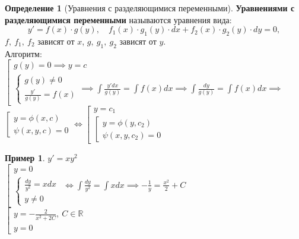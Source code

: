 \documentclass{report}
\theoremstyle{definition}
\newtheorem{definition}{Определение}[section]
\newtheorem{example}{Пример}
\begin{document}
\begin{definition}[Уравнения с разделяющимися переменными]
    \textbf{Уравнениями с разделяющимися переменными} называются уравнения вида:
    \begin{equation*}
        y'=f(x)\cdot g(y), \quad f_1(x) \cdot g_1(y)\cdot dx + f_2(x) \cdot g_2(y)\cdot dy = 0,
    \end{equation*}
    $f, \ f_1, \ f_2$ зависят от $x$, $g, \ g_1, \ g_2$ зависят от $y$. \\

    Алгоритм: \\

    $\left[
        \begin{array}{l}
            g(y) = 0 \implies y = c \\
            \left\{
            \begin{array}{l}
                g(y) \ne 0 \\
                \frac{y'}{g(y)} = f(x)
            \end{array}
            \right. \implies \int \frac{y'dx}{g(y)} = \int f(x)dx \implies \int \frac{dy}{g(y)} = \int f(x)dx \implies\end{array}
        \right.$ \\

    $\left[ \begin{array}{l}
            y = \phi(x,c) \\
            \psi (x,y,c) = 0
        \end{array}\right. \iff \left[\begin{array}{l}
            y = c_1 \\
            \left[\begin{array}{l}
                      y = \phi(y,c_2) \\
                      \psi(x,y,c_2) = 0
                  \end{array}
            \right.
        \end{array}\right.$
\end{definition}

\begin{example}
    $y' = xy^2$ \\

    $\left[\begin{array}{l}
            y = 0 \\
            \left\{\begin{array}{l}
                       \frac{dy}{y^2} = xdx \\
                       y \ne 0
                   \end{array}\right.
        \end{array}\right. \iff \int \frac{dy}{y^2} = \int xdx \implies -\frac{1}{y} = \frac{x^2}{2} + C$ \\

    $\left[\begin{array}{l}
            y = -\frac{2}{x^2 + 2C}, \ C \in \mathbb{R} \\
            y = 0
        \end{array}\right.$
\end{example}
\end{document}

